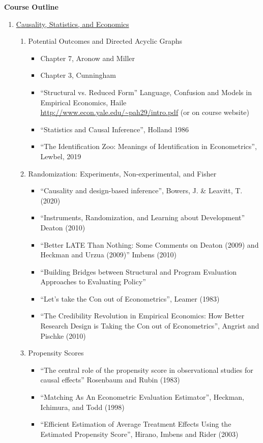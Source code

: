 \documentclass[11pt, a4paper]{article}
\begin{document}
\textbf{Course Outline}
\begin{enumerate}
\item \underline{Causality, Statistics, and Economics}
  \begin{enumerate}
  \item Potential Outcomes and Directed Acyclic Graphs
    \begin{itemize}
    \item Chapter 7, Aronow and Miller 
    \item Chapter 3, Cunningham
    \item ``Structural vs. Reduced Form'' Language, Confusion and Models in Empirical Economics, Haile \url{http://www.econ.yale.edu/~pah29/intro.pdf} (or on course website)
    \item ``Statistics and Causal Inference'', Holland 1986
    \item ``The Identification Zoo: Meanings of Identification in Econometrics'', Lewbel, 2019
    \end{itemize}
  \item Randomization: Experiments, Non-experimental, and Fisher
    \begin{itemize}
    \item ``Causality and design-based inference'', Bowers, J. \& Leavitt, T. (2020)
    \item ``Instruments, Randomization, and
      Learning about Development'' Deaton (2010)
    \item ``Better LATE Than Nothing: Some Comments on Deaton (2009) and Heckman and Urzua (2009)'' Imbens (2010)
    \item ``Building Bridges between Structural and Program Evaluation Approaches to Evaluating Policy''
    \item ``Let's take the Con out of Econometrics'', Leamer (1983)
    \item ``The Credibility Revolution in Empirical Economics: How Better Research Design is Taking the Con out of Econometrics'', Angrist and Pischke (2010)      
    \end{itemize}
  \item Propensity Scores
    \begin{itemize}
    \item ``The central role of the propensity score in observational
      studies for causal effects'' Rosenbaum and Rubin (1983)
    \item ``Matching As An Econometric Evaluation Estimator'', Heckman, Ichimura, and Todd (1998)
    \item ``Efficient Estimation of Average Treatment Effects Using the Estimated Propensity Score'', Hirano, Imbens and Rider (2003)

\end{itemize}
\end{enumerate}
\end{enumerate}
\end{document}
